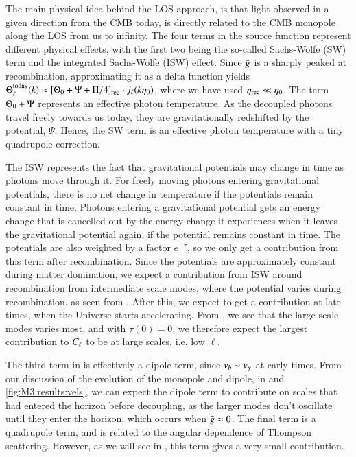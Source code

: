 The main physical idea behind the LOS approach, is that light observed in a given direction from the CMB today, is directly related to the CMB monopole along the LOS from us to infinity. The four terms in the source function represent different physical effects, with the first two being the so-called Sachs-Wolfe (SW) term and the integrated Sachs-Wolfe (ISW) effect. Since $\tilde{g}$ is a sharply peaked at recombination, approximating it as a delta function yields $\Theta_\ell^\mathrm{today}(k)\approx \left[ \Theta_0 + \Psi + \Pi/4 \right]_\mathrm{rec}\cdot j_\ell(k\eta_0)$, where we have used $\eta_\mathrm{rec}\ll\eta_0$. The term $\Theta_0+\Psi$ represents an effective photon temperature. As the decoupled photons travel freely towards us today, they are gravitationally redshifted by the potential, $\Psi$. Hence, the SW term is an effective photon temperature with a tiny quadrupole correction.

The ISW represents the fact that gravitational potentials may change in time as photons move through it. For freely moving photons entering gravitational potentials, there is no net change in temperature if the potentials remain constant in time. Photons entering a gravitational potential gets an energy change that is cancelled out by the energy change it experiences when it leaves the gravitational potential again, if the potential remains constant in time.  The potentials are also weighted by a factor $e^{-\tau}$, so we only get a contribution from this term after recombination. Since the potentials are approximately constant during matter domination, we expect a contribution from ISW around recombination from intermediate scale modes, where the potential varies during recombination, as seen from . After this, we expect to get a contribution at late times, when the Universe starts accelerating. From , we see that the large scale modes varies most, and with $\tau(0)=0$, we therefore expect the largest contribution to $C_\ell$ to be at large scales, i.e. low $\ell$.  

The third term in  is effectively a dipole term, since $v_b\sim v_\gamma$ at early times. From our discussion of the evolution of the monopole and dipole, in  and \ref{fig:M3:results:vels}, we can expect the dipole term to contribute on scales that had entered the horizon before decoupling, as the larger modes don't oscillate until they enter the horizon, which occurs when $\tilde{g}\approx0$. The final term is a quadrupole term, and is related to the angular dependence of Thompson scattering. However, as we will see in , this term gives a very small contribution.
